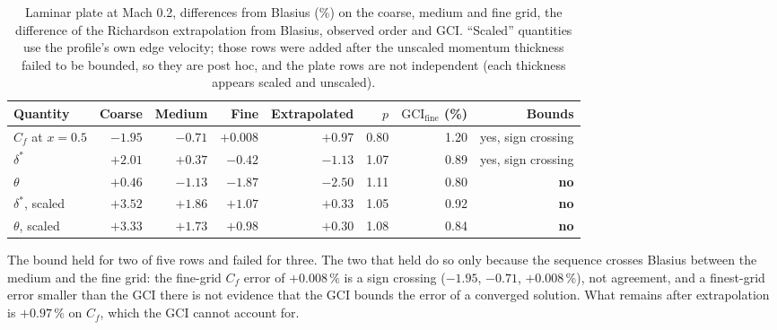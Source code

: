 \documentclass[11pt,a4paper]{article}
\newcommand{\fine}{\mathrm{fine}}
\newcommand{\cross}{\textbf{no}}
\begin{document}
\begin{table}[t]
\centering
\caption{Laminar plate at Mach 0.2, differences from Blasius (\%) on the coarse, medium and fine grid, the difference of the Richardson extrapolation from Blasius, observed order and GCI. ``Scaled'' quantities use the profile's own edge velocity; those rows were added after the unscaled momentum thickness failed to be bounded, so they are post hoc, and the plate rows are not independent (each thickness appears scaled and unscaled).}
\label{tab:plate}
\footnotesize
\setlength{\tabcolsep}{4pt}
\begin{tabular}{@{}lrrrrrrr@{}}
\toprule
Quantity & Coarse & Medium & Fine & Extrapolated & $p$ & $\mathrm{GCI}_\fine$ (\%) & Bounds \\
\midrule
$C_f$ at $x=0.5$ & $-1.95$ & $-0.71$ & $+0.008$ & $+0.97$ & 0.80 & 1.20 & yes, sign crossing \\
$\delta^*$ & $+2.01$ & $+0.37$ & $-0.42$ & $-1.13$ & 1.07 & 0.89 & yes, sign crossing \\
$\theta$ & $+0.46$ & $-1.13$ & $-1.87$ & $-2.50$ & 1.11 & 0.80 & \cross \\
$\delta^*$, scaled & $+3.52$ & $+1.86$ & $+1.07$ & $+0.33$ & 1.05 & 0.92 & \cross \\
$\theta$, scaled & $+3.33$ & $+1.73$ & $+0.98$ & $+0.30$ & 1.08 & 0.84 & \cross \\
\bottomrule
\end{tabular}
\end{table}

The bound held for two of five rows and failed for three.
The two that held do so only because the sequence crosses Blasius between the medium and the fine grid:
the fine-grid $C_f$ error of $+0.008\,\%$ is a sign crossing ($-1.95$, $-0.71$, $+0.008\,\%$), not agreement, and a
finest-grid error smaller than the GCI there is not evidence that the GCI bounds the error of a converged solution.
What remains after extrapolation is $+0.97\,\%$ on $C_f$, which the GCI cannot account for.
\end{document}
